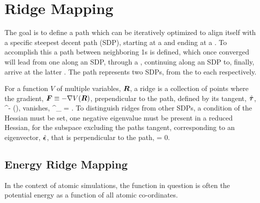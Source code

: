 \section{Ridge Mapping}
The goal is to define a path which can be iteratively optimized to align itself with a specific steepest decent path (SDP),
starting at a  and ending at a .
To accomplish this a path between neighboring \sap1s is defined,
which once converged will lead from one  along an SDP,
through a ,
continuing along an SDP to, finally, arrive at the latter .
The path represents two SDPs, from the  to each  respectively.

For a function $V$ of multiple variables, ${\bm{R}}$, a ridge is a collection of points where the gradient, ${\bm{F}} \equiv -\nabla V({\bm{R}})$, prependicular to the path, defined by its tangent, $\hat{{\bm{\tau}}}$,
\beq
\vF^\perp \equiv \vF - (\vF \cdot \uvt)\uvt,
\eeq
vanishes,
\beq
\vF^\perp_ = .
\eeq
To distinguish ridges from other SDPs,
a condition of the Hessian must be set,
one negative eigenvalue must be present in a reduced Hessian, for the subspace excluding the paths tangent,
corresponding to an eigenvector, $\hat{{\bm{\epsilon}}}$, that is perpendicular to the path,
\beq
\uvn \cdot \uvt = 0.
\eeq



\incomplete

\subsection{Energy Ridge Mapping}
In the context of atomic simulations, the function in question is often the potential energy as a function of all atomic co-ordinates.

\incomplete

